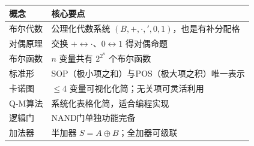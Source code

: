 \begin{table}[H]
\centering
\begin{tabular}{lp{10cm}}
\toprule
概念 & 核心要点 \\
\midrule
布尔代数 & 公理化代数系统 \((B,+,\cdot,{}',0,1)\)，也是有补分配格 \\
对偶原理 & 交换 \(+\leftrightarrow\cdot\)、\(0\leftrightarrow1\) 得对偶命题 \\
布尔函数 & \(n\) 变量共有 \(2^{2^n}\) 个布尔函数 \\
标准形 & SOP（极小项之和）与POS（极大项之积）唯一表示 \\
卡诺图 & \(\leqslant 4\) 变量可视化化简；无关项可灵活利用 \\
Q-M算法 & 系统化表格化简，适合编程实现 \\
逻辑门 & NAND门单独功能完备 \\
加法器 & 半加器 \(S=A\oplus B\)；全加器可级联 \\
\bottomrule
\end{tabular}
\end{table}
